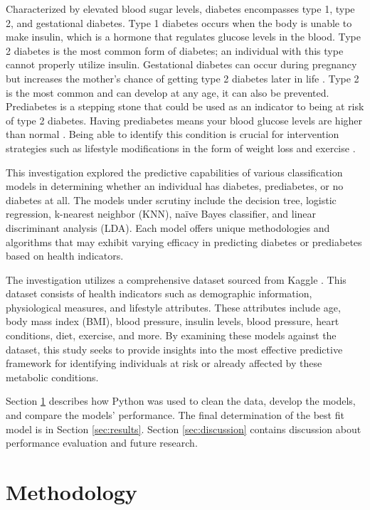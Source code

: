 \documentclass[journal]{IEEEtran}
\begin{document}
Characterized by elevated blood sugar levels, diabetes encompasses type 1, type 2, and gestational diabetes. Type 1 diabetes occurs when the body is unable to make insulin, which is a hormone that regulates glucose levels in the blood. Type 2 diabetes is the most common form of diabetes; an individual with this type cannot properly utilize insulin. Gestational diabetes can occur during pregnancy but increases the mother's chance of getting type 2 diabetes later in life \cite{b1}. Type 2 is the most common and can develop at any age, it can also be prevented. Prediabetes is a stepping stone that could be used as an indicator to being at risk of type 2 diabetes. Having prediabetes means your blood glucose levels are higher than normal \cite{b1}. Being able to identify this condition is crucial for intervention strategies such as lifestyle modifications in the form of weight loss and exercise \cite{b2}. 

This investigation explored the predictive capabilities of various classification models in determining whether an individual has diabetes, prediabetes, or no diabetes at all. The models under scrutiny include the decision tree, logistic regression, k-nearest neighbor (KNN), naïve Bayes classifier, and linear discriminant analysis (LDA). Each model offers unique methodologies and algorithms that may exhibit varying efficacy in predicting diabetes or prediabetes based on health indicators.

The investigation utilizes a comprehensive dataset sourced from Kaggle \cite{b3}. This dataset consists of health indicators such as demographic information, physiological measures, and lifestyle attributes. These attributes include age, body mass index (BMI), blood pressure, insulin levels, blood pressure, heart conditions, diet, exercise, and more. By examining these models against the dataset, this study seeks to provide insights into the most effective predictive framework for identifying individuals at risk or already affected by these metabolic conditions.

Section \ref{sec:methodology} describes how Python was used to clean the data, develop the models, and compare the models' performance. The final determination of the best fit model is in Section \ref{sec:results}. Section \ref{sec:discussion} contains discussion about performance evaluation and future research. 

\section{Methodology}
\label{sec:methodology}
\end{document}
